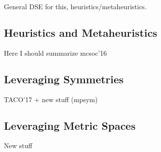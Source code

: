 General DSE for this, heuristics/metaheuristics.

\subsection{Heuristics and Metaheuristics}
Here I should summarize mcsoc'16
\Blindtext[10]

\subsection{Leveraging Symmetries}
TACO'17 + new stuff (mpsym)
\Blindtext[10]

\subsection{Leveraging Metric Spaces}
New stuff
\Blindtext[10]
